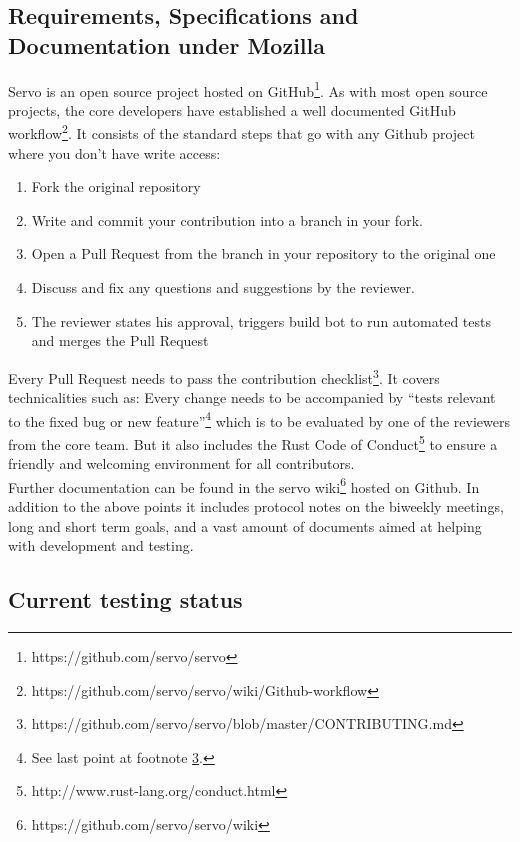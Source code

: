 \documentclass{scrartcl}
\begin{document}
\subsection{Requirements, Specifications and Documentation under Mozilla}
Servo is an open source project hosted on GitHub\footnote{https://github.com/servo/servo}. As with most open source projects, the core developers have established a well documented GitHub workflow\footnote{https://github.com/servo/servo/wiki/Github-workflow}. It consists of the standard steps that go with any Github project where you don't have write access:
\begin{enumerate}
    \item Fork the original repository
    \item Write and commit your contribution into a branch in your fork.
    \item Open a Pull Request from the branch in your repository to the original one
    \item Discuss and fix any questions and suggestions by the reviewer.
    \item The reviewer states his approval, triggers build bot to run automated tests and merges the Pull Request
\end{enumerate}

Every Pull Request needs to pass the contribution checklist\footnote{\label{contributing}https://github.com/servo/servo/blob/master/CONTRIBUTING.md}. It covers technicalities such as: Every change needs to be accompanied by ``tests relevant to the fixed bug or new feature''\footnote{See last point at footnote \ref{contributing}.} which is to be evaluated by one of the reviewers from the core team. But it also includes the Rust Code of Conduct\footnote{http://www.rust-lang.org/conduct.html} to ensure a friendly and welcoming environment for all contributors.  \\

Further documentation can be found in the servo wiki\footnote{https://github.com/servo/servo/wiki} hosted on Github. In addition to the above points it includes protocol notes on the biweekly meetings, long and short term goals, and a vast amount of documents aimed at helping with development and testing.

\subsection{Current testing status}
\end{document}
